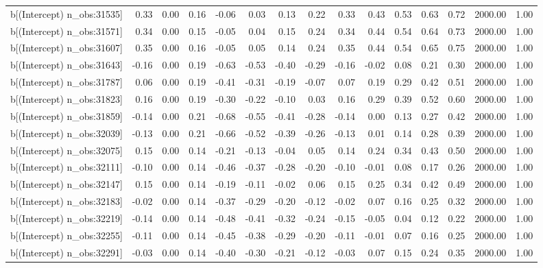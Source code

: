 \begin{table}[ht]
\begin{tabular}{rrrrrrrrrrrrrrr}
  b[(Intercept) n\_obs:31535] & 0.33 & 0.00 & 0.16 & -0.06 & 0.03 & 0.13 & 0.22 & 0.33 & 0.43 & 0.53 & 0.63 & 0.72 & 2000.00 & 1.00 \\ 
  b[(Intercept) n\_obs:31571] & 0.34 & 0.00 & 0.15 & -0.05 & 0.04 & 0.15 & 0.24 & 0.34 & 0.44 & 0.54 & 0.64 & 0.73 & 2000.00 & 1.00 \\ 
  b[(Intercept) n\_obs:31607] & 0.35 & 0.00 & 0.16 & -0.05 & 0.05 & 0.14 & 0.24 & 0.35 & 0.44 & 0.54 & 0.65 & 0.75 & 2000.00 & 1.00 \\ 
  b[(Intercept) n\_obs:31643] & -0.16 & 0.00 & 0.19 & -0.63 & -0.53 & -0.40 & -0.29 & -0.16 & -0.02 & 0.08 & 0.21 & 0.30 & 2000.00 & 1.00 \\ 
  b[(Intercept) n\_obs:31787] & 0.06 & 0.00 & 0.19 & -0.41 & -0.31 & -0.19 & -0.07 & 0.07 & 0.19 & 0.29 & 0.42 & 0.51 & 2000.00 & 1.00 \\ 
  b[(Intercept) n\_obs:31823] & 0.16 & 0.00 & 0.19 & -0.30 & -0.22 & -0.10 & 0.03 & 0.16 & 0.29 & 0.39 & 0.52 & 0.60 & 2000.00 & 1.00 \\ 
  b[(Intercept) n\_obs:31859] & -0.14 & 0.00 & 0.21 & -0.68 & -0.55 & -0.41 & -0.28 & -0.14 & 0.00 & 0.13 & 0.27 & 0.42 & 2000.00 & 1.00 \\ 
  b[(Intercept) n\_obs:32039] & -0.13 & 0.00 & 0.21 & -0.66 & -0.52 & -0.39 & -0.26 & -0.13 & 0.01 & 0.14 & 0.28 & 0.39 & 2000.00 & 1.00 \\ 
  b[(Intercept) n\_obs:32075] & 0.15 & 0.00 & 0.14 & -0.21 & -0.13 & -0.04 & 0.05 & 0.14 & 0.24 & 0.34 & 0.43 & 0.50 & 2000.00 & 1.00 \\ 
  b[(Intercept) n\_obs:32111] & -0.10 & 0.00 & 0.14 & -0.46 & -0.37 & -0.28 & -0.20 & -0.10 & -0.01 & 0.08 & 0.17 & 0.26 & 2000.00 & 1.00 \\ 
  b[(Intercept) n\_obs:32147] & 0.15 & 0.00 & 0.14 & -0.19 & -0.11 & -0.02 & 0.06 & 0.15 & 0.25 & 0.34 & 0.42 & 0.49 & 2000.00 & 1.00 \\ 
  b[(Intercept) n\_obs:32183] & -0.02 & 0.00 & 0.14 & -0.37 & -0.29 & -0.20 & -0.12 & -0.02 & 0.07 & 0.16 & 0.25 & 0.32 & 2000.00 & 1.00 \\ 
  b[(Intercept) n\_obs:32219] & -0.14 & 0.00 & 0.14 & -0.48 & -0.41 & -0.32 & -0.24 & -0.15 & -0.05 & 0.04 & 0.12 & 0.22 & 2000.00 & 1.00 \\ 
  b[(Intercept) n\_obs:32255] & -0.11 & 0.00 & 0.14 & -0.45 & -0.38 & -0.29 & -0.20 & -0.11 & -0.01 & 0.07 & 0.16 & 0.25 & 2000.00 & 1.00 \\ 
  b[(Intercept) n\_obs:32291] & -0.03 & 0.00 & 0.14 & -0.40 & -0.30 & -0.21 & -0.12 & -0.03 & 0.07 & 0.15 & 0.24 & 0.35 & 2000.00 & 1.00 \\ 

\end{tabular}
\end{table}
